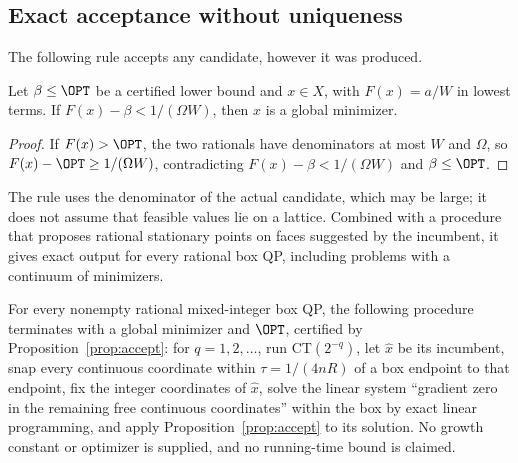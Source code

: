 \subsection{Exact acceptance without uniqueness}
The following rule accepts any candidate, however it was produced.

\begin{proposition}\label{prop:accept}
Let $\beta\le\OPT$ be a certified lower bound and $x\in X$, with
$F(x)=a/W$ in lowest terms. If $F(x)-\beta<1/(\Omega W)$, then $x$ is a global
minimizer.
\end{proposition}

\begin{proof}
If $F(x)>\OPT$, the two rationals have denominators at most $W$ and $\Omega$, so
$F(x)-\OPT\ge1/(\Omega W)$, contradicting $F(x)-\beta<1/(\Omega W)$ and $\beta\le\OPT$.
\end{proof}

The rule uses the denominator of the actual candidate, which may be large;
it does not assume that feasible values lie on a lattice. Combined with a
procedure that proposes rational stationary points on faces suggested by
the incumbent, it gives exact output for every rational box QP, including
problems with a continuum of minimizers.

\begin{theorem}\label{thm:finite}
For every nonempty rational mixed-integer box QP, the following procedure
terminates with a global minimizer and $\OPT$, certified by
Proposition~\ref{prop:accept}: for $q=1,2,\dots$, run CT$(2^{-q})$, let
$\hat x$ be its incumbent, snap every continuous coordinate within
$\tau=1/(4nR)$ of a box endpoint to that endpoint, fix the integer
coordinates of $\hat x$, solve the linear system ``gradient zero in the
remaining free continuous coordinates'' within the box by exact linear
programming, and apply Proposition~\ref{prop:accept} to its solution. No
growth constant or optimizer is supplied, and no running-time bound is
claimed.
\end{theorem}

